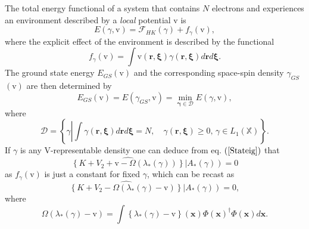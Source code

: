 \documentclass[aps,preprint]{revtex4}%
\begin{document}
The total energy functional of a system that contains $N$ electrons and
experiences an environment described by a \emph{local} potential $\mathrm{v}$
is
\begin{equation}
E\left(  \gamma\mathbf{,}\mathrm{v}\right)  =\mathcal{F}_{HK}\left(
\gamma\right)  +f_{\gamma}\left(  \mathrm{v}\right)  ,
\end{equation}
where the explicit effect of the environment is described by the functional
\begin{equation}
f_{\gamma}\left(  \mathrm{v}\right)  =\int\mathrm{v}\left(  \mathbf{r,\xi
}\right)  \gamma\left(  \mathbf{r,\xi}\right)  d\mathbf{r}d\mathbf{\xi.}%
\end{equation}
The ground state energy $E_{GS}\left(  \mathrm{v}\right)  $ and the
corresponding space-spin density $\gamma_{GS}$ $\left(  \mathrm{v}\right)  $
are then determined by
\begin{equation}
E_{GS}\left(  \mathrm{v}\right)  =E\left(  \gamma_{GS}\mathbf{,}%
\mathrm{v}\right)  =\min_{\mathbf{\gamma\in}\mathcal{D}}E\left(
\gamma\mathbf{,}\mathrm{v}\right)  , \label{GS}%
\end{equation}
where
\begin{equation}
\mathcal{D}=\left\{  \gamma\left\vert \int\gamma\left(  \mathbf{r,\xi}\right)
d\mathbf{r}d\mathbf{\xi}=N,\quad\gamma\left(  \mathbf{r,\xi}\right)
\geq0,\,\gamma\in L_{1}\left(  \mathbb{X}\right)  \right.  \right\}  .
\end{equation}
If $\gamma$ is any V-representable density one can deduce from eq. $\left(
\ref{Stateig}\right)  $ that
\begin{equation}
\widehat{\left\{  K+V_{2}+\mathrm{v}-\Omega\left(  \lambda_{\ast}\left(
\gamma\right)  \right)  \right\}  }\left\vert A_{\ast}\left(  \gamma\right)
\right)  =0 \label{vstat}%
\end{equation}
as $f_{\gamma}\left(  \mathrm{v}\right)  $ is just a constant for fixed
$\gamma$, which can be recast as
\begin{equation}
\widehat{\left\{  K+V_{2}-\Omega\left(  \lambda_{\ast}\left(  \gamma\right)
-\mathrm{v}\right)  \right\}  }\left\vert A_{\ast}\left(  \gamma\right)
\right)  =0,
\end{equation}
where
\begin{equation}
\Omega\left(  \lambda_{\ast}\left(  \gamma\right)  -\mathrm{v}\right)
=\int\left\{  \lambda_{\ast}\left(  \gamma\right)  -\mathrm{v}\right\}
\left(  \mathbf{x}\right)  \Phi\left(  \mathbf{x}\right)  ^{\dagger}%
\Phi\left(  \mathbf{x}\right)  d\mathbf{x.}%
\end{equation}
\end{document}
